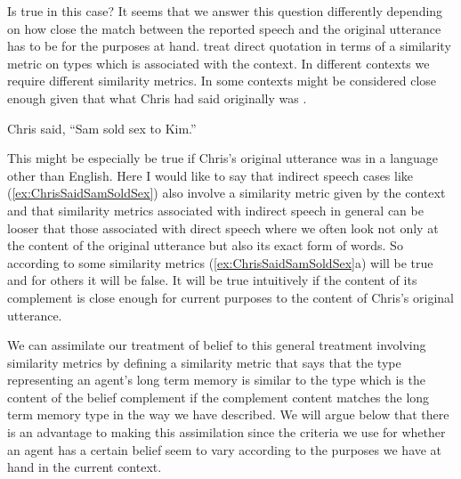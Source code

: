 Is  true in this case?  It seems that we answer this
question differently depending on how close the match between the
reported speech and the original utterance has to be for the purposes
at hand. \cite{GinzburgCooper2014} treat direct quotation in
terms of a similarity metric on types which is associated with the context.  In different
contexts we require different similarity metrics.  In some contexts
\nexteg{} might be considered close enough given that what Chris had
said originally was .
\begin{ex} 
Chris said, ``Sam sold sex to Kim.'' 
\end{ex} 
This might be especially be true if
Chris's original utterance was in a language other than English. Here
I would like to say that indirect speech cases like
(\ref{ex:ChrisSaidSamSoldSex}) also involve a similarity metric given
by the context and that similarity metrics associated with indirect
speech in general can be looser that those associated with direct
speech where we often look not only at the content of the original
utterance but also its exact form of words. So according to some
similarity metrics (\ref{ex:ChrisSaidSamSoldSex}a) will be true and
for others it will be false.  It will be true intuitively if the
content of its complement is close enough for current purposes to the
content of Chris's original utterance.

We can assimilate our treatment of belief to this general treatment
involving similarity metrics by defining a similarity metric that says
that the type representing an agent's long term memory is similar to
the type which is the content of the belief complement if the
complement content matches the long term memory type in the way we
have described.  We will argue below that there is an advantage to
making this assimilation since the criteria we use for whether an
agent has a certain belief seem to vary according to the purposes we have
at hand in the current context.          

